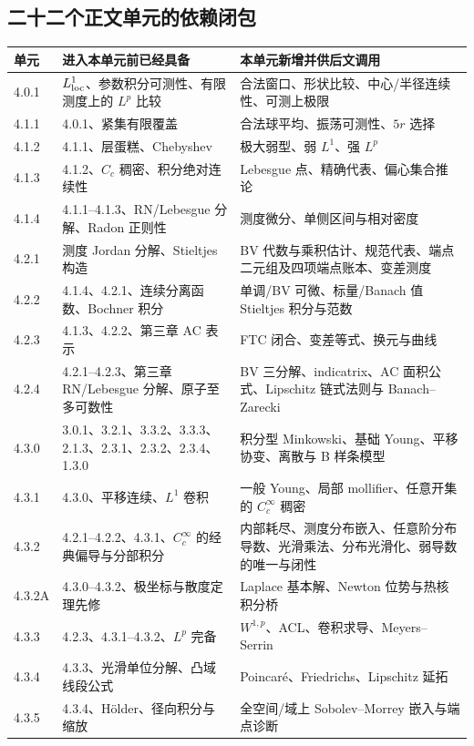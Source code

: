 \documentclass[11pt,a4paper]{ctexart}
\begin{document}
\subsection{二十二个正文单元的依赖闭包}

\begin{longtable}{p{}p{}p{}}
\toprule
单元 & 进入本单元前已经具备 & 本单元新增并供后文调用\\
\midrule
4.0.1 & $L^1_{\rm loc}$、参数积分可测性、有限测度上的 $L^p$ 比较 & 合法窗口、形状比较、中心/半径连续性、可测上极限\\
4.1.1 & 4.0.1、紧集有限覆盖 & 合法球平均、振荡可测性、$5r$ 选择\\
4.1.2 & 4.1.1、层蛋糕、Chebyshev & 极大弱型、弱 $L^1$、强 $L^p$\\
4.1.3 & 4.1.2、$C_c$ 稠密、积分绝对连续性 & Lebesgue 点、精确代表、偏心集合推论\\
4.1.4 & 4.1.1--4.1.3、RN/Lebesgue 分解、Radon 正则性 & 测度微分、单侧区间与相对密度\\
4.2.1 & 测度 Jordan 分解、Stieltjes 构造 & BV 代数与乘积估计、规范代表、端点二元组及四项端点账本、变差测度\\
4.2.2 & 4.1.4、4.2.1、连续分离函数、Bochner 积分 & 单调/BV 可微、标量/Banach 值 Stieltjes 积分与范数\\
4.2.3 & 4.1.3、4.2.2、第三章 AC 表示 & FTC 闭合、变差等式、换元与曲线\\
4.2.4 & 4.2.1--4.2.3、第三章 RN/Lebesgue 分解、原子至多可数性 & BV 三分解、indicatrix、AC 面积公式、Lipschitz 链式法则与 Banach--Zarecki\\
4.3.0 & 3.0.1、3.2.1、3.3.2、3.3.3、2.1.3、2.3.1、2.3.2、2.3.4、1.3.0 & 积分型 Minkowski、基础 Young、平移协变、离散与 B 样条模型\\
4.3.1 & 4.3.0、平移连续、$L^1$ 卷积 & 一般 Young、局部 mollifier、任意开集的 $C_c^\infty$ 稠密\\
4.3.2 & 4.2.1--4.2.2、4.3.1、$C_c^\infty$ 的经典偏导与分部积分 & 内部耗尽、测度分布嵌入、任意阶分布导数、光滑乘法、分布光滑化、弱导数的唯一与闭性\\
4.3.2A & 4.3.0--4.3.2、极坐标与散度定理先修 & Laplace 基本解、Newton 位势与热核积分桥\\
4.3.3 & 4.2.3、4.3.1--4.3.2、$L^p$ 完备 & $W^{1,p}$、ACL、卷积求导、Meyers--Serrin\\
4.3.4 & 4.3.3、光滑单位分解、凸域线段公式 & Poincar\'e、Friedrichs、Lipschitz 延拓\\
4.3.5 & 4.3.4、H\"older、径向积分与缩放 & 全空间/域上 Sobolev--Morrey 嵌入与端点诊断\\

\end{longtable}
\end{document}
